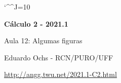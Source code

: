 \documentclass[oneside,12pt]{article}
\begin{document}
\catcode`\^^J=10

\pu

%
%

\def\drafturl{http://angg.twu.net/LATEX/2021-1-C2.pdf}
\def\drafturl{http://angg.twu.net/2021.1-C2.html}
\def\draftfooter{\tiny \href{\drafturl}{\jobname{}} \ColorBrown{\shorttoday{} \hours}}



%

\thispagestyle{empty}

\begin{center}

\vspace*{1.2cm}

{\bf \Large Cálculo 2 - 2021.1}

\bsk

Aula 12: Algumas figuras


\bsk

Eduardo Ochs - RCN/PURO/UFF

\url{http://angg.twu.net/2021.1-C2.html}

\end{center}
\end{document}
